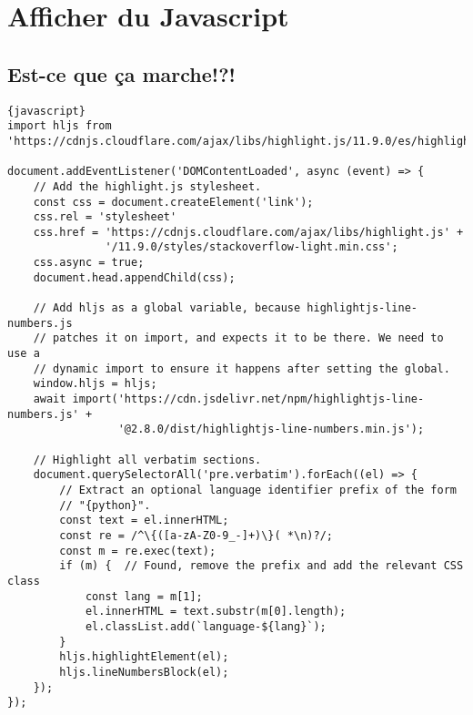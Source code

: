 \documentclass[a4paper,11pt]{article}
\begin{document}
\section{Afficher du Javascript}
\subsection{Est-ce que ça marche!?!}
\begin{verbatim}{javascript}
import hljs from 'https://cdnjs.cloudflare.com/ajax/libs/highlight.js/11.9.0/es/highlight.min.js';

document.addEventListener('DOMContentLoaded', async (event) => {
    // Add the highlight.js stylesheet.
    const css = document.createElement('link');
    css.rel = 'stylesheet'
    css.href = 'https://cdnjs.cloudflare.com/ajax/libs/highlight.js' +
               '/11.9.0/styles/stackoverflow-light.min.css';
    css.async = true;
    document.head.appendChild(css);

    // Add hljs as a global variable, because highlightjs-line-numbers.js
    // patches it on import, and expects it to be there. We need to use a
    // dynamic import to ensure it happens after setting the global.
    window.hljs = hljs;
    await import('https://cdn.jsdelivr.net/npm/highlightjs-line-numbers.js' +
                 '@2.8.0/dist/highlightjs-line-numbers.min.js');

    // Highlight all verbatim sections.
    document.querySelectorAll('pre.verbatim').forEach((el) => {
        // Extract an optional language identifier prefix of the form
        // "{python}".
        const text = el.innerHTML;
        const re = /^\{([a-zA-Z0-9_-]+)\}( *\n)?/;
        const m = re.exec(text);
        if (m) {  // Found, remove the prefix and add the relevant CSS class
            const lang = m[1];
            el.innerHTML = text.substr(m[0].length);
            el.classList.add(`language-${lang}`);
        }
        hljs.highlightElement(el);
        hljs.lineNumbersBlock(el);
    });
});
\end{verbatim}
\end{document}
